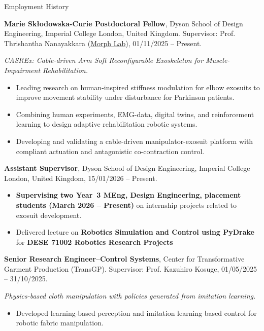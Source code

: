 

\begin{rubric}{Employment History}

\entry*[2025 -- Present]%
	\textbf{Marie Skłodowska-Curie Postdoctoral Fellow}, Dyson School of Design Engineering, Imperial College London, United Kingdom. Supervisor: Prof. Thrishantha Nanayakkara (\href{https://www.imperial.ac.uk/morph-lab/}{Morph Lab}), 01/11/2025 -- Present.
    \par \textit{CASREx: Cable-driven Arm Soft Reconfigurable Exoskeleton for Muscle-Impairment Rehabilitation.}
    \begin{itemize}
    \item Leading research on human-inspired stiffness modulation for elbow exosuits to improve movement stability under disturbance for Parkinson patients.
    \item Combining human experiments, EMG-data, digital twins, and reinforcement learning to design adaptive rehabilitation robotic systems.
    \item Developing and validating a cable-driven manipulator-exosuit platform with compliant actuation and antagonistic co-contraction control.
    \end{itemize}

\entry*[2026 -- Present]%
	\textbf{Assistant Supervisor}, Dyson School of Design Engineering, Imperial College London, United Kingdom, 15/01/2026 -- Present.
    \begin{itemize}
    \item \textbf{Supervising two Year~3 MEng, Design Engineering, placement students (March 2026 -- Present)} on internship projects related to exosuit development.
	\item Delivered lecture on \textbf{Robotics Simulation and Control using PyDrake} for \textbf{DESE 71002 Robotics Research Projects}
    \end{itemize}

\entry*[2024 -- 2025]%
	\textbf{Senior Research Engineer--Control Systems}, Center for Transformative Garment Production (TransGP). Supervisor: Prof. Kazuhiro Kosuge, 01/05/2025 -- 31/10/2025.
    \par \textit{Physics-based cloth manipulation with policies generated from imitation learning.}
    \begin{itemize}
        \item Developed learning-based perception and imitation learning based control for robotic fabric manipulation.


\end{itemize}
\end{rubric}
